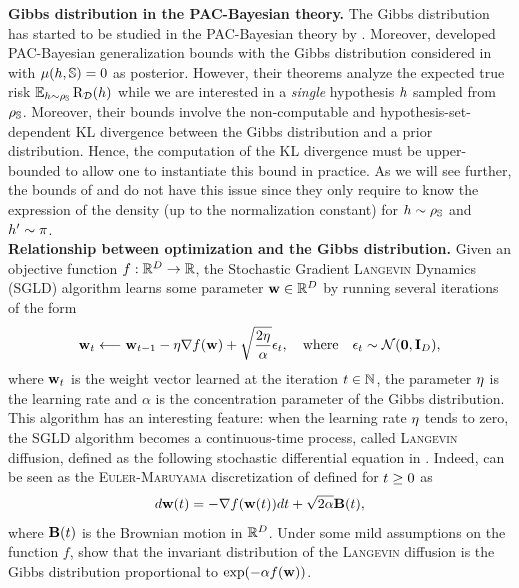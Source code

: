 \textbf{Gibbs distribution in the PAC-Bayesian theory.} The Gibbs distribution has started to be studied in the PAC-Bayesian theory by \citet{Catoni2004,Catoni2007}.
Moreover, \citet[Theorem 4.2 and 4.3]{AlquierRidgwayChopin2016} developed PAC-Bayesian generalization bounds with the Gibbs distribution considered in  with $\operatorname{\mu}(h,\mathbb{S})=0$ as posterior.
However, their theorems analyze the expected true risk $\operatorname*{\mathbb{E}}_{h\sim\rho_{\mathbb{S}}}\text{R}_{\mathcal{D}}(h)$ while we are interested in a {\it single} hypothesis $h$ sampled from $\rho_{\mathbb{S}}$.
Moreover, their bounds involve the non-computable and hypothesis-set-dependent KL divergence between the Gibbs distribution and a prior distribution.
Hence, the computation of the KL divergence must be upper-bounded to allow one to instantiate this bound in practice.
As we will see further, the bounds of  and  do not have this issue since they only require to know the expression of the density (up to the normalization constant) for $h\sim\rho_{\mathbb{S}}$ and $h'\sim\pi$.\\

\textbf{Relationship between optimization and the Gibbs distribution.} 
Given an objective function $f:\mathbb{R}^D\to \mathbb{R}$, the Stochastic Gradient \textsc{Langevin} Dynamics (SGLD) algorithm \citep{WellingTeh2011} learns some parameter $\mathbf{w}\in\mathbb{R}^D$ by running several iterations of the form 
\begin{align}
    \mathbf{w}_t \longleftarrow \mathbf{w}_{t-1} - \eta\nabla f(\mathbf{w}) + \sqrt{\frac{2\eta}{\alpha}}\epsilon_t, \quad\text{where}\quad \epsilon_t\sim\mathcal{N}({\mathbf 0}, \mathbf{I}_D),\label{chap:dis-mu:eq:sgld}
\end{align}
where $\mathbf{w}_t$ is the weight vector learned at the iteration $t\in\mathbb{N}$, the parameter $\eta$ is the learning rate and $\alpha$ is the concentration parameter of the Gibbs distribution.
This algorithm has an interesting feature: when the learning rate $\eta$ tends to zero, the SGLD algorithm becomes a continuous-time process, called \textsc{Langevin} diffusion, defined as the following stochastic differential equation in .
Indeed,  can be seen as the \textsc{Euler}-\textsc{Maruyama} discretization \citep[see \eg,][]{RaginskyRakhlinTelgarsky2017} of  defined for $t\ge 0$ as
\begin{align}
    d\mathbf{w}(t) = -\nabla f(\mathbf{w}(t))dt + \sqrt{2\alpha}\mathbf{B}(t),\label{chap:dis-mu:eq:sgld-2}
\end{align}
where $\mathbf{B}(t)$ is the Brownian motion in $\mathbb{R}^D$.
Under some mild assumptions on the function $f$, \citet{Chiang1987} show that the invariant distribution of the \textsc{Langevin} diffusion is the Gibbs distribution proportional to $\exp(-\alpha f(\mathbf{w}))$.

